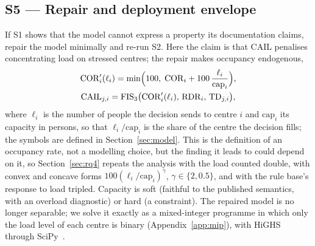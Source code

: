 \documentclass[systems,article,submit,moreauthors,pdftex]{Definitions/mdpi}
\begin{document}
\subsection{S5 --- Repair and deployment envelope}
If S1 shows that the model cannot express a property its documentation claims, repair the
model minimally and re-run S2. Here the claim is that CAIL penalises concentrating load on
stressed centres; the repair makes occupancy endogenous,
\begin{equation}
\begin{gathered}
\mathrm{COR}'_i(\ell_i) = \min\Bigl(100,\; \mathrm{COR}_i + 100\,\frac{\ell_i}{\mathrm{cap}_i}\Bigr),\\
\mathrm{CAIL}_{j,i} = \mathrm{FIS}_3\bigl(\mathrm{COR}'_i(\ell_i),\, \mathrm{RDR}_i,\, \mathrm{TD}_{j,i}\bigr),
\end{gathered}
\label{eq:repair}
\end{equation}
where $\ell_i$ is the number of people the decision sends to centre $i$ and
$\mathrm{cap}_i$ its capacity in persons, so that $\ell_i/\mathrm{cap}_i$ is the share of the
centre the decision fills; the symbols are defined in Section~\ref{sec:model}. This is the
definition of an occupancy rate, not a modelling choice, but the finding it leads to could
depend on it, so Section~\ref{sec:rq4} repeats the analysis with the load counted double, with
convex and concave forms $100(\ell_i/\mathrm{cap}_i)^{\gamma}$, $\gamma \in \{2, 0.5\}$, and with
the rule base's response to load tripled. Capacity is soft (faithful to the published semantics,
with an overload diagnostic) or hard (a constraint). The repaired model is no longer separable;
we solve it exactly as a mixed-integer programme in which only the load level of each centre is
binary (Appendix~\ref{app:mip}), with HiGHS~\cite{huangfu2018highs} through
SciPy~\cite{virtanen2020scipy}.
\end{document}
